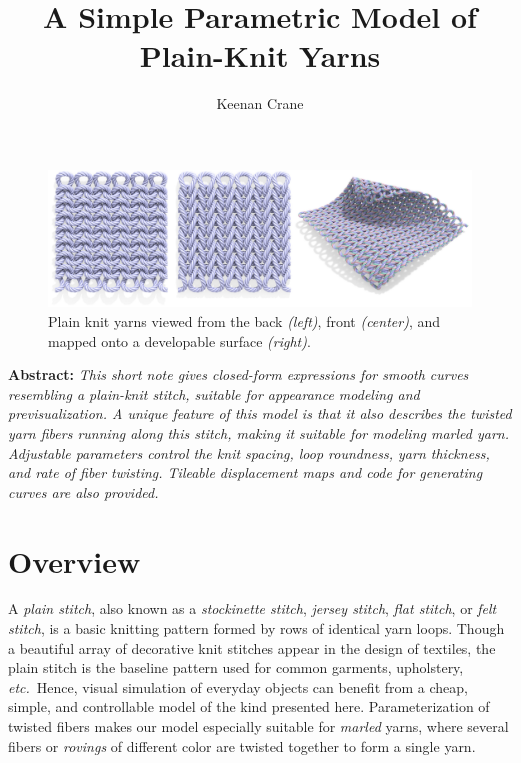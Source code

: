 \documentclass{article}
\title{A Simple Parametric Model of Plain-Knit Yarns}
\author{Keenan Crane}
\newcommand{\etc}{\emph{etc.}}
\begin{document}
\maketitle

\begin{figure}[h!]
   \centering
   \includegraphics[width=.8\textwidth]{images/teaser.jpg}
   \caption{Plain knit yarns viewed from the back \emph{(left)}, front \emph{(center)}, and mapped onto a developable surface \emph{(right)}.\label{fig:teaser}}
\end{figure}

\textbf{Abstract:} \emph{This short note gives closed-form expressions for smooth curves resembling a plain-knit stitch, suitable for appearance modeling and previsualization.  A unique feature of this model is that it also describes the twisted yarn fibers running along this stitch, making it suitable for modeling marled yarn. Adjustable parameters control the knit spacing, loop roundness, yarn thickness, and rate of fiber twisting.  Tileable displacement maps and code for generating curves are also provided.}

\section{Overview}

A \emph{plain stitch}, also known as a \emph{stockinette stitch}, \emph{jersey stitch}, \emph{flat stitch}, or \emph{felt stitch}, is a basic knitting pattern formed by rows of identical yarn loops.  Though a beautiful array of decorative knit stitches appear in the design of textiles, the plain stitch is the baseline pattern used for common garments, upholstery, \etc{}\  Hence, visual simulation of everyday objects can benefit from a cheap, simple, and controllable model of the kind presented here.  Parameterization of twisted fibers makes our model especially suitable for \emph{marled} yarns, where several fibers or \emph{rovings} of different color are twisted together to form a single yarn.
\end{document}
